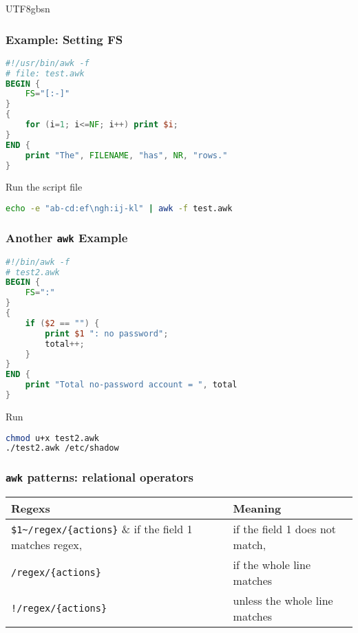 \documentclass[red]{beamer}
\newcommand*{\lstverb}{\lstinline[style=caret]}
\begin{document}
\begin{CJK*}{UTF8}{gbsn}
\begin{frame}
\frametitle{Example: Setting FS}
\begin{lstlisting}[language=awk,format=awk]
#!/usr/bin/awk -f
# file: test.awk
BEGIN {
	FS="[:-]"
}
{
	for (i=1; i<=NF; i++) print $i;
}
END {
	print "The", FILENAME, "has", NR, "rows."
}
\end{lstlisting}
\begin{block}{\centering\footnotesize Run the script file}
\begin{lstlisting}[language=bash]
echo -e "ab-cd:ef\ngh:ij-kl" | awk -f test.awk
\end{lstlisting}
\end{block}
\end{frame}


\begin{frame}
\frametitle{Another \texttt{awk} Example}
\begin{lstlisting}[language=awk,format=awk]
#!/bin/awk -f
# test2.awk
BEGIN {
	FS=":"
}
{
	if ($2 == "") {
		print $1 ": no password";
		total++;
	}
}
END {
	print "Total no-password account = ", total
}
\end{lstlisting}
\begin{block}{\centering\footnotesize Run}
\begin{lstlisting}[language=bash]
chmod u+x test2.awk
./test2.awk /etc/shadow
\end{lstlisting}
\end{block}
\end{frame}



\begin{frame}
\frametitle{\texttt{awk} patterns: relational operators}
\begin{table}[ht]
\scriptsize
\begin{tabular}{ll}
\hline
\textbf{Regexs} & Meaning\\
\hline
\lstverb|$1~/regex/{actions}| & if the field 1 matches regex,\\
\lstverb|$1!~/regex/{actions}| & if the field 1 does not match,\\
\lstverb|/regex/{actions}| & if the whole line matches\\
\lstverb|!/regex/{actions}| & unless the whole line matches\\
\hline
\end{tabular}
\end{table}


\end{frame}
\end{CJK*}
\end{document}
